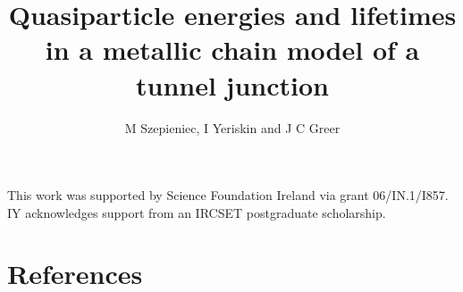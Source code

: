 \documentclass[12pt]{iopart}
\begin{document}
\title{Quasiparticle energies and lifetimes in a metallic chain model of a tunnel junction}
\author{M Szepieniec, I Yeriskin and J C  Greer}
\address{Tyndall National Institute, University College Cork, Cork, Ireland}



\begin{abstract}
	
	\acresetall %
\end{abstract}

\submitto{\NT}

\maketitle



\ack
This work was supported by Science Foundation Ireland via grant 06/IN.1/I857.
IY acknowledges support from an IRCSET postgraduate scholarship. 

\section*{References}


\end{document}
